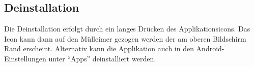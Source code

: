 \subsection{Deinstallation}
Die Deinstallation erfolgt durch ein langes Drücken des Applikationsicons. Das Icon kann dann auf den Mülleimer gezogen werden der am oberen Bildschirm Rand erscheint. Alternativ kann die Applikation auch in den Android-Einstellungen unter \enquote{Apps} deinstalliert werden.